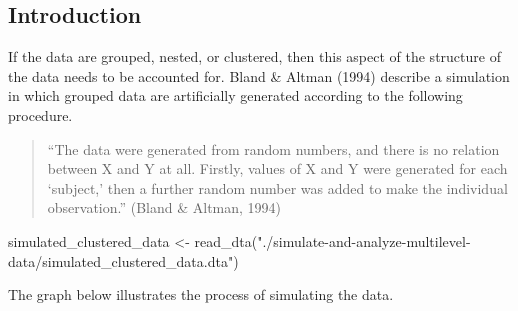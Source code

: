 \documentclass[
  letterpaper,
  DIV=11,
  numbers=noendperiod]{scrreprt}
\newenvironment{Shaded}{\begin{snugshade}}{\end{snugshade}}
\newcommand{\FunctionTok}[1]{\textcolor[rgb]{0.28,0.35,0.67}{#1}}
\newcommand{\NormalTok}[1]{\textcolor[rgb]{0.00,0.23,0.31}{#1}}
\newcommand{\OtherTok}[1]{\textcolor[rgb]{0.00,0.23,0.31}{#1}}
\newcommand{\StringTok}[1]{\textcolor[rgb]{0.13,0.47,0.30}{#1}}
\begin{document}
\hypertarget{introduction-1}{%
\subsection{Introduction}\label{introduction-1}}

If the data are grouped, nested, or clustered, then this aspect of the
structure of the data needs to be accounted for. Bland \& Altman (1994)
describe a simulation in which grouped data are artificially generated
according to the following procedure.

\begin{quote}
``The data were generated from random numbers, and there is no relation
between X and Y at all. Firstly, values of X and Y were generated for
each `subject,' then a further random number was added to make the
individual observation.'' (Bland \& Altman, 1994)
\end{quote}

\begin{Shaded}
\begin{Highlighting}[]
\NormalTok{simulated\_clustered\_data }\OtherTok{\textless{}{-}}
  \FunctionTok{read\_dta}\NormalTok{(}\StringTok{"./simulate{-}and{-}analyze{-}multilevel{-}data/simulated\_clustered\_data.dta"}\NormalTok{)}
\end{Highlighting}
\end{Shaded}

The graph below illustrates the process of simulating the data.
\end{document}
